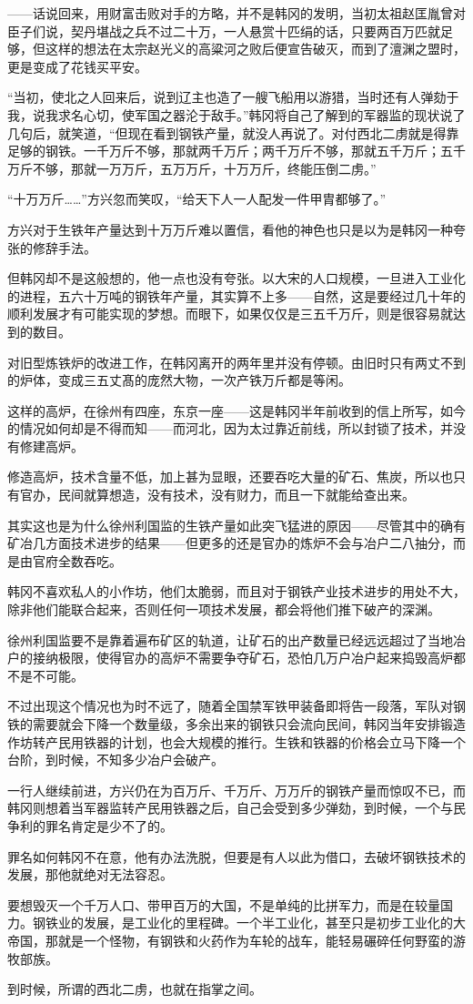 ——话说回来，用财富击败对手的方略，并不是韩冈的发明，当初太祖赵匡胤曾对臣子们说，契丹堪战之兵不过二十万，一人悬赏十匹绢的话，只要两百万匹就足够，但这样的想法在太宗赵光义的高粱河之败后便宣告破灭，而到了澶渊之盟时，更是变成了花钱买平安。

“当初，使北之人回来后，说到辽主也造了一艘飞船用以游猎，当时还有人弹劾于我，说我求名心切，使军国之器沦于敌手。”韩冈将自己了解到的军器监的现状说了几句后，就笑道，“但现在看到钢铁产量，就没人再说了。对付西北二虏就是得靠足够的钢铁。一千万斤不够，那就两千万斤；两千万斤不够，那就五千万斤；五千万斤不够，那就一万万斤，五万万斤，十万万斤，终能压倒二虏。”

“十万万斤……”方兴忽而笑叹，“给天下人一人配发一件甲胄都够了。”

方兴对于生铁年产量达到十万万斤难以置信，看他的神色也只是以为是韩冈一种夸张的修辞手法。

但韩冈却不是这般想的，他一点也没有夸张。以大宋的人口规模，一旦进入工业化的进程，五六十万吨的钢铁年产量，其实算不上多——自然，这是要经过几十年的顺利发展才有可能实现的梦想。而眼下，如果仅仅是三五千万斤，则是很容易就达到的数目。

对旧型炼铁炉的改进工作，在韩冈离开的两年里并没有停顿。由旧时只有两丈不到的炉体，变成三五丈髙的庞然大物，一次产铁万斤都是等闲。

这样的高炉，在徐州有四座，东京一座——这是韩冈半年前收到的信上所写，如今的情况如何却是不得而知——而河北，因为太过靠近前线，所以封锁了技术，并没有修建高炉。

修造高炉，技术含量不低，加上甚为显眼，还要吞吃大量的矿石、焦炭，所以也只有官办，民间就算想造，没有技术，没有财力，而且一下就能给查出来。

其实这也是为什么徐州利国监的生铁产量如此突飞猛进的原因——尽管其中的确有矿冶几方面技术进步的结果——但更多的还是官办的炼炉不会与冶户二八抽分，而是由官府全数吞吃。

韩冈不喜欢私人的小作坊，他们太脆弱，而且对于钢铁产业技术进步的用处不大，除非他们能联合起来，否则任何一项技术发展，都会将他们推下破产的深渊。

徐州利国监要不是靠着遍布矿区的轨道，让矿石的出产数量已经远远超过了当地冶户的接纳极限，使得官办的高炉不需要争夺矿石，恐怕几万户冶户起来捣毁高炉都不是不可能。

不过出现这个情况也为时不远了，随着全国禁军铁甲装备即将告一段落，军队对钢铁的需要就会下降一个数量级，多余出来的钢铁只会流向民间，韩冈当年安排锻造作坊转产民用铁器的计划，也会大规模的推行。生铁和铁器的价格会立马下降一个台阶，到时候，不知多少冶户会破产。

一行人继续前进，方兴仍在为百万斤、千万斤、万万斤的钢铁产量而惊叹不已，而韩冈则想着当军器监转产民用铁器之后，自己会受到多少弹劾，到时候，一个与民争利的罪名肯定是少不了的。

罪名如何韩冈不在意，他有办法洗脱，但要是有人以此为借口，去破坏钢铁技术的发展，那他就绝对无法容忍。

要想毁灭一个千万人口、带甲百万的大国，不是单纯的比拼军力，而是在较量国力。钢铁业的发展，是工业化的里程碑。一个半工业化，甚至只是初步工业化的大帝国，那就是一个怪物，有钢铁和火药作为车轮的战车，能轻易碾碎任何野蛮的游牧部族。

到时候，所谓的西北二虏，也就在指掌之间。

